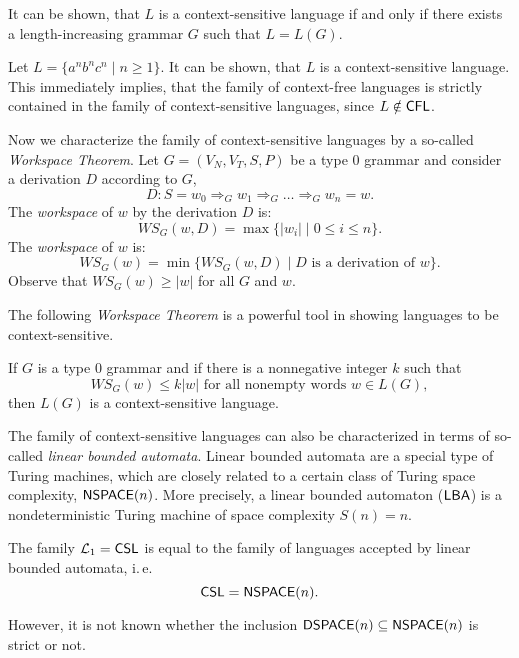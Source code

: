 It can be shown, that $L$ is a context-sensitive language if and only if there exists a length-increasing grammar $G$ such that $L = L(G)$.

Let $L = \{a^n b^n c^n \mid n \ge 1\}$. It can be shown, that $L$ is a context-sensitive language. This immediately implies, that the family of context-free languages is strictly contained in the family of context-sensitive languages, since $L \notin \textup{\sf CFL}$.

Now we characterize the family of context-sensitive languages by a so-called \emph{Workspace Theorem}. Let $G = (V_N, V_T, S, P)$ be a type $0$ grammar and consider a derivation $D$ according to $G$, $$D: S = w_0 \Rightarrow_G w_1 \Rightarrow_G \ldots \Rightarrow_G w_n = w.$$ The \emph{workspace} of $w$ by the derivation $D$ is: $$WS_G(w, D) = \max \{|w_i| \mid 0 \le i \le n\}.$$ The \emph{workspace} of $w$ is: $$WS_G(w) = \min \{WS_G(w, D) \mid D \text{ is a derivation of } w\}.$$ Observe that $WS_G(w) \ge |w|$ for all $G$ and $w$.

The following \emph{Workspace Theorem} is a powerful tool in showing languages to be context-sensitive.

\begin{theorem}
If $G$ is a type $0$ grammar and if there is a nonnegative integer $k$ such that $$WS_G(w) \le k |w| \text{ for all nonempty words } w \in L(G),$$ then $L(G)$ is a context-sensitive language.
\end{theorem}

The family of context-sensitive languages can also be characterized in terms of so-called \emph{linear bounded automata}. Linear bounded automata are a special type of Turing machines, which are closely related to a certain class of Turing space complexity, $\textup{\sf NSPACE}(n)$. More precisely, a linear bounded automaton \index{$\LBA$}($\LBA$) is a nondeterministic Turing machine of space complexity $S(n) = n$.

\begin{theorem}
The family $\mathcal{L}_1 = \textup{\sf CSL}$ is equal to the family of languages accepted by linear bounded automata, i.\,e.\ $$\textup{\sf CSL} = \textup{\sf NSPACE}(n).$$
\end{theorem}

However, it is not known whether the inclusion $\textup{\sf DSPACE}(n) \subseteq \textup{\sf NSPACE}(n)$ is strict or not.

